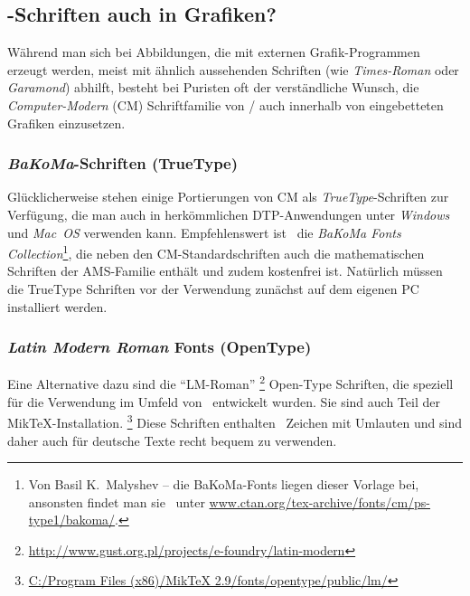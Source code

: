 \subsection{\tex-Schriften auch in Grafiken?}
\label{sec:tex-schriften-in-grafiken}

Während man sich bei Abbildungen, die mit externen
Grafik-Programmen erzeugt werden, meist mit ähnlich aussehenden
Schriften (wie \emph{Times-Roman} oder \emph{Garamond}) abhilft,
besteht bei Puristen oft der verständliche Wunsch, die 
\emph{Computer-Modern} (CM) Schriftfamilie von {\tex}/{\latex} auch
innerhalb von eingebetteten Grafiken einzusetzen.

\subsubsection{\emph{BaKoMa}-Schriften (TrueType)}

Glücklicherweise stehen einige Portierungen von CM als {\em
TrueType}-Schriften zur Verfügung, die man auch in herkömmlichen
DTP-Anwendungen unter \emph{Windows} und \emph{Mac~OS} verwenden
kann. Empfehlenswert ist \zB\ die \emph{BaKoMa Fonts
Collection}\footnote{Von Basil K.\ Malyshev -- die BaKoMa-Fonts
liegen dieser Vorlage bei, ansonsten findet man sie \zB\ unter
\url{www.ctan.org/tex-archive/fonts/cm/ps-type1/bakoma/}.}, die
neben den CM-Standardschriften auch die mathematischen Schriften
der AMS-Familie ent\-hält und zudem kostenfrei ist. Natürlich
müssen die TrueType Schriften vor der Verwendung zunächst auf dem
eigenen PC installiert werden. 

\subsubsection{\emph{Latin Modern Roman} Fonts (OpenType)}

Eine Alternative dazu sind die  "`LM-Roman"'%
\footnote{\url{http://www.gust.org.pl/projects/e-foundry/latin-modern}}
 Open-Type Schriften, die speziell für die Verwendung im Umfeld von \latex\ entwickelt wurden.
Sie sind auch Teil der MikTeX-Installation.%
\footnote{\url{C:/Program Files (x86)/MikTeX 2.9/fonts/opentype/public/lm/}}
Diese Schriften enthalten \ua\ Zeichen mit Umlauten und sind daher auch für deutsche Texte recht
bequem zu verwenden.

